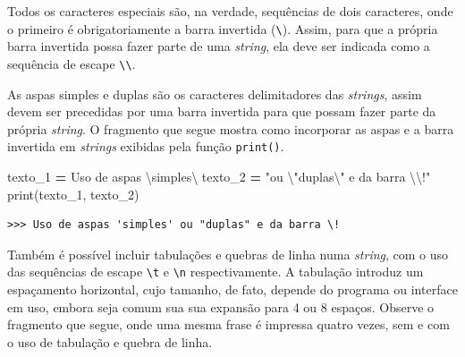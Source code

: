 \documentclass[
]{book}
\newenvironment{Shaded}{\begin{snugshade}}{\end{snugshade}}
\newcommand{\BuiltInTok}[1]{#1}
\newcommand{\CharTok}[1]{\textcolor[rgb]{0.31,0.60,0.02}{#1}}
\newcommand{\NormalTok}[1]{#1}
\newcommand{\OperatorTok}[1]{\textcolor[rgb]{0.81,0.36,0.00}{\textbf{#1}}}
\newcommand{\StringTok}[1]{\textcolor[rgb]{0.31,0.60,0.02}{#1}}
\begin{document}
Todos os caracteres especiais são, na verdade, sequências de dois caracteres, onde o primeiro é obrigatoriamente a barra invertida (\texttt{\textbackslash{}}). Assim, para que a própria barra invertida possa fazer parte de uma \emph{string}, ela deve ser indicada como a sequência de escape \texttt{\textbackslash{}\textbackslash{}}.

As aspas simples e duplas são os caracteres delimitadores das \emph{strings}, assim devem ser precedidas por uma barra invertida para que possam fazer parte da própria \emph{string}. O fragmento que segue mostra como incorporar as aspas e a barra invertida em \emph{strings} exibidas pela função \texttt{print()}.

\begin{Shaded}
\begin{Highlighting}[]
\NormalTok{texto\_1 }\OperatorTok{=} \StringTok{\textquotesingle{}Uso de aspas }\CharTok{\textbackslash{}\textquotesingle{}}\StringTok{simples}\CharTok{\textbackslash{}\textquotesingle{}}\StringTok{\textquotesingle{}}
\NormalTok{texto\_2 }\OperatorTok{=} \StringTok{"ou }\CharTok{\textbackslash{}"}\StringTok{duplas}\CharTok{\textbackslash{}"}\StringTok{ e da barra }\CharTok{\textbackslash{}\textbackslash{}}\StringTok{!"}
\BuiltInTok{print}\NormalTok{(texto\_1, texto\_2)}
\end{Highlighting}
\end{Shaded}

\begin{verbatim}
>>> Uso de aspas 'simples' ou "duplas" e da barra \!
\end{verbatim}

Também é possível incluir tabulações e quebras de linha numa \emph{string}, com o uso das sequências de escape \texttt{\textbackslash{}t} e \texttt{\textbackslash{}n} respectivamente. A tabulação introduz um espaçamento horizontal, cujo tamanho, de fato, depende do programa ou interface em uso, embora seja comum sua sua expansão para 4 ou 8 espaços. Observe o fragmento que segue, onde uma mesma frase é impressa quatro vezes, sem e com o uso de tabulação e quebra de linha.
\end{document}
